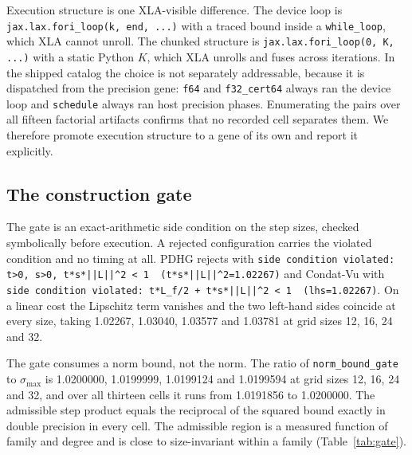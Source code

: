 Execution structure is one XLA-visible difference. The device loop is
\texttt{jax.lax.fori\_loop(k, end, ...)} with a traced bound inside a
\texttt{while\_loop}, which XLA cannot unroll. The chunked structure is
\texttt{jax.lax.fori\_loop(0, K, ...)} with a static Python $K$, which XLA
unrolls and fuses across iterations. In the shipped catalog the choice is not
separately addressable, because it is dispatched from the precision gene:
\texttt{f64} and \texttt{f32\_cert64} always ran the device loop and
\texttt{schedule} always ran host precision phases.
Enumerating the pairs over all fifteen factorial artifacts confirms that no
recorded cell separates them. We therefore promote execution structure to a
gene of its own and report it explicitly.

\subsection{The construction gate}
\label{sec:gate}

The gate is an exact-arithmetic side condition on the step sizes, checked
symbolically before execution. A rejected configuration carries the violated
condition and no timing at all.
PDHG rejects with
\verb!side condition violated: t>0, s>0, t*s*||L||^2 < 1  (t*s*||L||^2=1.02267)!
and Condat-Vu with
\verb!side condition violated: t*L_f/2 + t*s*||L||^2 < 1  (lhs=1.02267)!.
On a linear cost the Lipschitz term vanishes and the two left-hand sides
coincide at every size, taking 1.02267, 1.03040, 1.03577 and 1.03781 at grid
sizes 12, 16, 24 and 32.

The gate consumes a norm bound, not the norm. The ratio of
\texttt{norm\_bound\_gate} to $\sigma_{\max}$ is 1.0200000, 1.0199999,
1.0199124 and 1.0199594 at grid sizes 12, 16, 24 and 32, and over all thirteen
cells it runs from 1.0191856 to 1.0200000. The admissible step product equals
the reciprocal of the squared bound exactly in double precision in every
cell. The admissible region is a measured function of family and degree
and is close to size-invariant within a family (Table~\ref{tab:gate}).

